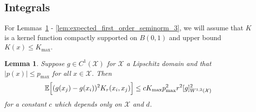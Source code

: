 \documentclass{article}
\newcommand{\abs}[1]{\left \lvert #1 \right \rvert}
\newcommand{\1}{\mathbf{1}}
\newcommand{\Xset}{\mathcal{X}}
\newcommand{\Ebb}{\mathbb{E}}
\theoremstyle{alden}
\theoremstyle{aldenthm}
\newtheorem{lemma}{Lemma}
\theoremstyle{definition}
\theoremstyle{remark}
\begin{document}
\subsection{Integrals}

For Lemmas~\ref{lem:expected_first_order_seminorm} - \ref{lem:expected_first_order_seminorm_3}, we will assume that $K$ is a kernel function compactly supported on $B(0,1)$ and upper bound $K(x) \leq K_{\max}$.

\begin{lemma}
	\label{lem:expected_first_order_seminorm}
	Suppose $g \in C^{1}(\Xset)$ for $\Xset$ a Lipschitz domain and that $\abs{p(x)} \leq p_{\max}$ for all $x \in \Xset$. Then
	\begin{equation*}
	\Ebb\Bigl[(g(x_j) - g(x_i))^2K_r(x_i,x_j)\Bigr] \leq c K_{\max} p_{\max}^2 r^2 [g]_{W^{1,2}(\Xset)}^2
	\end{equation*}
	for a constant $c$ which depends only on $\Xset$ and $d$.
\end{lemma}
\end{document}
